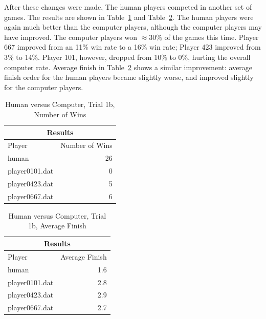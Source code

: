 After these changes were made, The human players competed in another set of
games. The results are shown in Table~\ref{tab:human_results1c} and
Table~\ref{tab:human_results1d}. The human players were again much better than
the computer players, although the computer players may have improved. The
computer players won \(\approx30\%\) of the games this time. Player 667
improved from an 11\% win rate to a 16\% win rate; Player 423 improved from 3\%
to 14\%. Player 101, however, dropped from 10\% to 0\%, hurting the overall
computer rate. Average finish in Table~\ref{tab:human_results1d} shows a similar
improvement: average finish order for the human players became slightly worse,
and improved slightly for the computer players. 

\begin{table}[htbp]
  \centering
  \caption{Human versus Computer, Trial 1b, Number of Wins}
    \begin{tabular}{lr}
    \toprule
    \multicolumn{2}{c}{Results}\\
    \midrule
    Player  & Number of Wins \\
 \midrule
    \multicolumn{1}{l}{human} & 26 \\
    \multicolumn{1}{l}{player0101.dat} & 0 \\
    \multicolumn{1}{l}{player0423.dat} & 5 \\
    \multicolumn{1}{l}{player0667.dat} & 6 \\
    \bottomrule
    \end{tabular}%
  \label{tab:human_results1c}%
\end{table}%

\begin{table}[htbp]
  \centering
  \caption{Human versus Computer, Trial 1b, Average Finish}
    \begin{tabular}{lr}
    \toprule
    \multicolumn{2}{c}{Results} \\
    \midrule
    Player & Average Finish \\
 \midrule
    \multicolumn{1}{l}{human} & 1.6 \\
    \multicolumn{1}{l}{player0101.dat} & 2.8 \\
    \multicolumn{1}{l}{player0423.dat} & 2.9 \\
    \multicolumn{1}{l}{player0667.dat} & 2.7 \\
    \bottomrule
    \end{tabular}%
  \label{tab:human_results1d}%
\end{table}%

